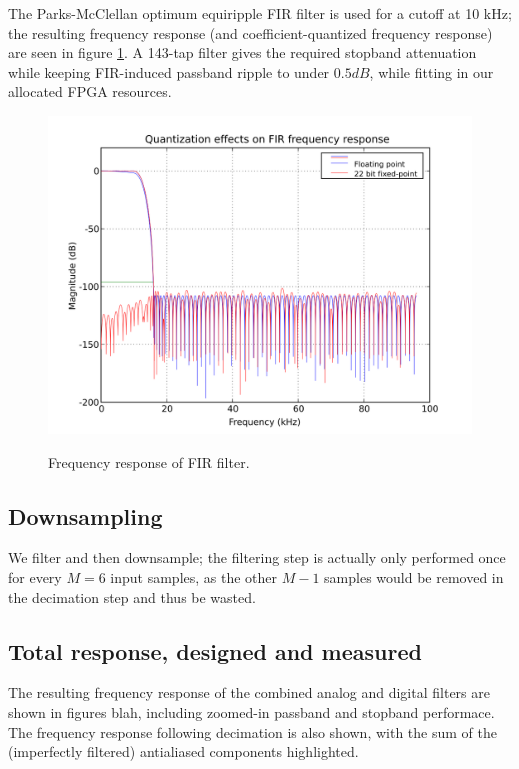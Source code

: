 The Parks-McClellan optimum equiripple FIR filter is used for a cutoff
at 10 kHz; the resulting frequency response (and coefficient-quantized
frequency response) are seen in figure \ref{FIR}. A 143-tap filter
gives the required stopband attenuation while keeping FIR-induced
passband ripple to under $0.5 dB$, while fitting in our allocated FPGA
resources.

\begin{figure}[h!]
  \includegraphics[scale=0.7]{soma-1.digital.quant.svg}
  \label{FIR}
  \caption{Frequency response of FIR filter.}
\end{figure}

\subsection{Downsampling}
We filter and then downsample; the filtering step is actually only
performed once for every $M=6$ input samples, as the other $M-1$
samples would be removed in the decimation step and thus be wasted.

\subsection{Total response, designed and measured}
The resulting frequency response of the combined analog and digital
filters are shown in figures blah, including zoomed-in passband and
stopband performace. The frequency response following decimation is
also shown, with the sum of the (imperfectly filtered) antialiased
components highlighted.

